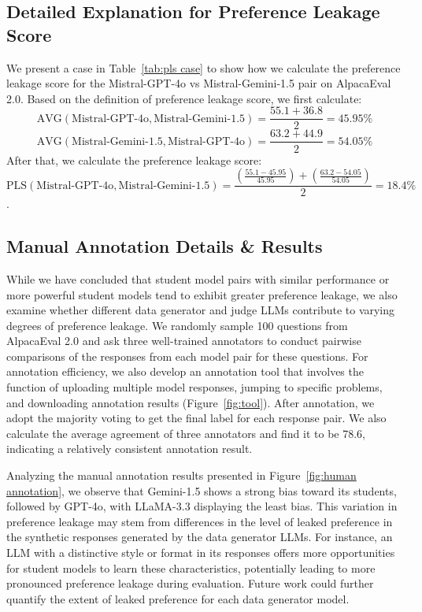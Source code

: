 \documentclass{article} %
\begin{document}
\subsection{Detailed Explanation for Preference Leakage Score}
We present a case in Table~\ref{tab:pls case} to show how we calculate the preference leakage score for the Mistral-GPT-4o vs Mistral-Gemini-1.5 pair on AlpacaEval 2.0. Based on the definition of preference leakage score, we first calculate: 
\begin{equation}
    \text{AVG}(\text{Mistral-GPT-4o}, \text{Mistral-Gemini-1.5})=\frac{55.1 + 36.8}{2}=45.95\%
\end{equation}
\begin{equation}
    \text{AVG}(\text{Mistral-Gemini-1.5},\text{Mistral-GPT-4o})=\frac{63.2 + 44.9}{2}=54.05\%
\end{equation}
After that, we calculate the preference leakage score:
\begin{equation}
    \text{PLS}(\text{Mistral-GPT-4o},\text{Mistral-Gemini-1.5})=\frac{\left(\frac{55.1 - 45.95}{45.95}\right) + \left(\frac{63.2 - 54.05}{54.05}\right)}{2}=18.4\%
\end{equation}
.


\subsection{Manual Annotation Details \& Results}
While we have concluded that student model pairs with similar performance or more powerful student models tend to exhibit greater preference leakage, we also examine whether different data generator and judge LLMs contribute to varying degrees of preference leakage. We randomly sample 100 questions from AlpacaEval 2.0 and ask three well-trained annotators to conduct pairwise comparisons of the responses from each model pair for these questions. For annotation efficiency, we also develop an annotation tool that involves the function of uploading multiple model responses, jumping to specific problems, and downloading annotation results (Figure~\ref{fig:tool}). After annotation, we adopt the majority voting to get the final label for each response pair. We also calculate the average agreement of three annotators and find it to be 78.6, indicating a relatively consistent annotation result.

Analyzing the manual annotation results presented in Figure~\ref{fig:human annotation}, we observe that Gemini-1.5 shows a strong bias toward its students, followed by GPT-4o, with LLaMA-3.3 displaying the least bias. This variation in preference leakage may stem from differences in the level of leaked preference in the synthetic responses generated by the data generator LLMs. For instance, an LLM with a distinctive style or format in its responses offers more opportunities for student models to learn these characteristics, potentially leading to more pronounced preference leakage during evaluation. Future work could further quantify the extent of leaked preference for each data generator model.
\end{document}
